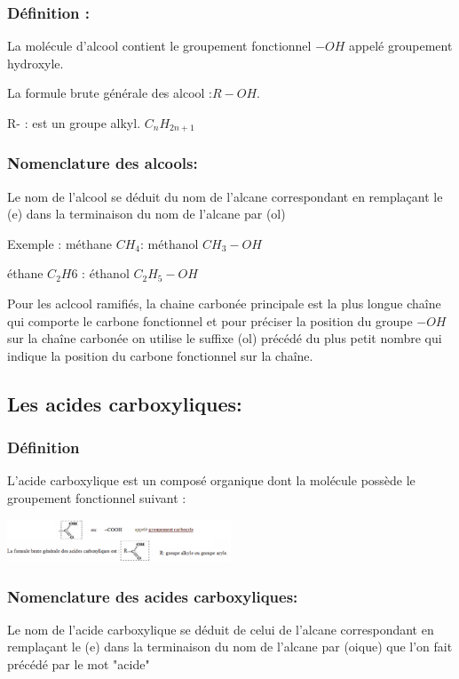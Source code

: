 \documentclass[12pt]{article}
\begin{document}
  \subsubsection{Définition :}

La molécule d'alcool contient le groupement fonctionnel $-OH$ appelé groupement hydroxyle.

La formule brute générale des alcool :$R-OH$.

R- : est un groupe alkyl. $C_nH_{2n+1}$


\subsubsection{Nomenclature des alcools: }
Le nom de l'alcool se déduit du nom de l'alcane correspondant en remplaçant le (e) dans la terminaison du nom de l'alcane par (ol)

Exemple : 
méthane $CH_4$: méthanol $CH_3-OH$


éthane $C_2H6$ : éthanol $C_2H_5-OH$

Pour les aclcool ramifiés, la chaine carbonée principale est la plus longue chaîne qui comporte le carbone fonctionnel et pour préciser la position du groupe $-OH$ sur la chaîne carbonée on utilise le suffixe (ol) précédé du plus petit nombre qui indique la position du carbone fonctionnel sur la chaîne.



\subsection{Les acides carboxyliques:}
\subsubsection{Définition}
L’acide carboxylique est un composé organique dont la molécule possède le groupement fonctionnel
suivant :
\begin{center}
	\includegraphics[width=0.5\textwidth]{./img/acideOique.png}

\end{center}



\subsubsection{Nomenclature des acides carboxyliques:}
Le nom de l'acide carboxylique se déduit de celui de l'alcane correspondant en remplaçant le (e) dans la terminaison du nom de l'alcane par (oique) que l'on fait précédé par le mot "acide"
\end{document}
